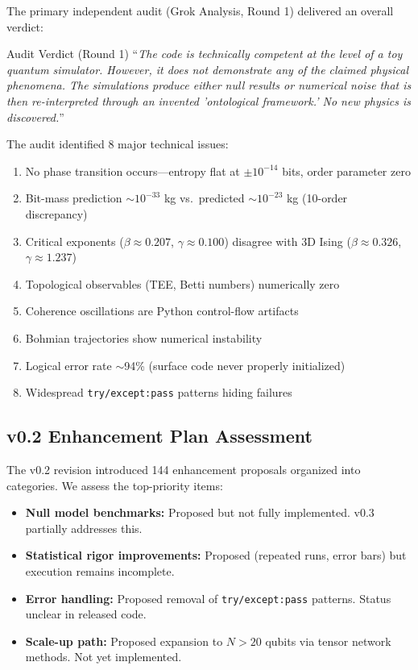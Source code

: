 \documentclass[11pt,a4paper]{article}
\begin{document}
The primary independent audit (Grok Analysis, Round 1) delivered an overall verdict:

\begin{critbox}{Audit Verdict (Round 1)}
``\textit{The code is technically competent at the level of a toy quantum simulator. However, it does not demonstrate any of the claimed physical phenomena. The simulations produce either null results or numerical noise that is then re-interpreted through an invented 'ontological framework.' No new physics is discovered.}''
\end{critbox}

The audit identified 8 major technical issues:
\begin{enumerate}[leftmargin=1.5em]
  \item No phase transition occurs---entropy flat at $\pm 10^{-14}$ bits, order parameter zero
  \item Bit-mass prediction $\sim 10^{-33}$ kg vs.\ predicted $\sim 10^{-23}$ kg (10-order discrepancy)
  \item Critical exponents ($\beta \approx 0.207$, $\gamma \approx 0.100$) disagree with 3D Ising ($\beta \approx 0.326$, $\gamma \approx 1.237$)
  \item Topological observables (TEE, Betti numbers) numerically zero
  \item Coherence oscillations are Python control-flow artifacts
  \item Bohmian trajectories show numerical instability
  \item Logical error rate $\sim$94\% (surface code never properly initialized)
  \item Widespread \texttt{try/except:pass} patterns hiding failures
\end{enumerate}

\subsection{v0.2 Enhancement Plan Assessment}

The v0.2 revision introduced 144 enhancement proposals organized into categories. We assess the top-priority items:

\begin{itemize}[leftmargin=1.5em]
  \item \textbf{Null model benchmarks:} Proposed but not fully implemented. v0.3 partially addresses this.
  \item \textbf{Statistical rigor improvements:} Proposed (repeated runs, error bars) but execution remains incomplete.
  \item \textbf{Error handling:} Proposed removal of \texttt{try/except:pass} patterns. Status unclear in released code.
  \item \textbf{Scale-up path:} Proposed expansion to $N > 20$ qubits via tensor network methods. Not yet implemented.
\end{itemize}
\end{document}

